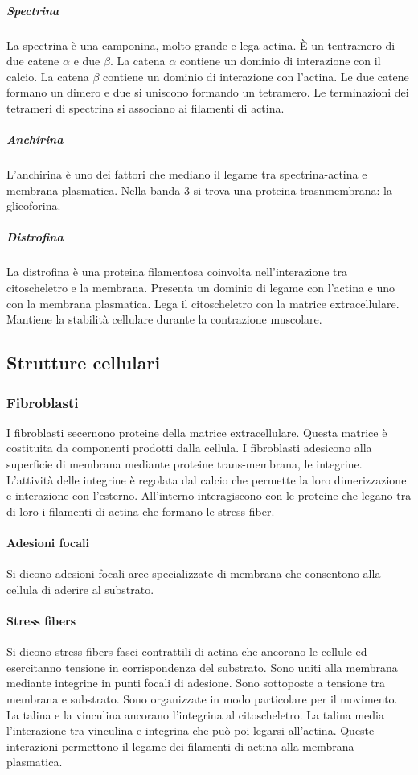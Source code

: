 				\subparagraph{Spectrina}
				La spectrina \`e una camponina, molto grande e lega actina.
				\`E un tentramero di due catene $\alpha$ e due $\beta$.
				La catena $\alpha$ contiene un dominio di interazione con il calcio.
				La catena $\beta$ contiene un dominio di interazione con l'actina.
				Le due catene formano un dimero e due si uniscono formando un tetramero.
				Le terminazioni dei tetrameri di spectrina si associano ai filamenti di actina.

				\subparagraph{Anchirina}
				L'anchirina \`e uno dei fattori che mediano il legame tra spectrina-actina e membrana plasmatica.
				Nella banda $3$ si trova una proteina trasnmembrana: la glicoforina.

				\subparagraph{Distrofina}
				La distrofina \`e una proteina filamentosa coinvolta nell'interazione tra citoscheletro e la membrana.
				Presenta un dominio di legame con l'actina e uno con la membrana plasmatica.
				Lega il citoscheletro con la matrice extracellulare.
				Mantiene la stabilit\`a cellulare durante la contrazione muscolare.

	\subsection{Strutture cellulari}

		\subsubsection{Fibroblasti}
		I fibroblasti secernono proteine della matrice extracellulare.
		Questa matrice \`e costituita da componenti prodotti dalla cellula.
		I fibroblasti adesicono alla superficie di membrana mediante proteine trans-membrana, le integrine.
		L'attivit\`a delle integrine \`e regolata dal calcio che permette la loro dimerizzazione e interazione con l'esterno.
		All'interno interagiscono con le proteine che legano tra di loro i filamenti di actina che formano le stress fiber.

			\paragraph{Adesioni focali}
			Si dicono adesioni focali aree specializzate di membrana che consentono alla cellula di aderire al substrato.

			\paragraph{Stress fibers}
			Si dicono stress fibers fasci contrattili di actina che ancorano le cellule ed esercitanno tensione in corrispondenza del substrato.
			Sono uniti alla membrana mediante integrine in punti focali di adesione.
			Sono sottoposte a tensione tra membrana e substrato.
			Sono organizzate in modo particolare per il movimento.
			La talina e la vinculina ancorano l'integrina al citoscheletro.
			La talina media l'interazione tra vinculina e integrina che pu\`o poi legarsi all'actina.
			Queste interazioni permettono il legame dei filamenti di actina alla membrana plasmatica.

